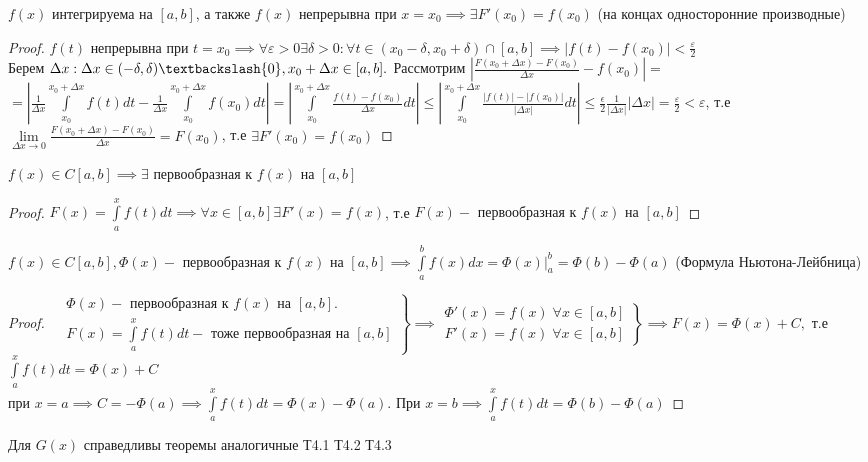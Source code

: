 \documentclass[../main.tex]{subfiles}
\begin{document}
\begin{theorem}
    $f(x)$ интегрируема на $[a,b]$, а также $f(x)$ непрерывна при $x=x_{0}\implies \exists F'(x_{0})=f(x_{0})$ (на концах односторонние производные)
\end{theorem}
\begin{proof}
    $f(t) $ непрерывна при $t=x_{0}\implies \forall \varepsilon >0 \exists \delta > 0 : \forall t\in (x_{0}-\delta,x_{0}+\delta)\cap [a,b]\implies |f(t)-f(x_{0})|<\frac{\varepsilon}{2}$\\ 
    Берем $\Delta x : \Delta x \in (-\delta,\delta) \textbackslash \{0\},x_{0}+\Delta x\in [a,b].$ Рассмотрим $\left| \frac{F(x_{0}+\Delta x)-F(x_{0})}{\Delta x}-f(x_{0}) \right|=$\\ \vspace{0.5cm}$ = \left| \frac{1}{\Delta x} \int\limits_{ x_{0}    }^{x_{0}+\Delta x} f(t)dt- \frac{1}{\Delta x}\int\limits_{x_{0}}^{x_{0}+\Delta x}f(x_{0})dt\right| =\left| \int\limits_{x_{0}}^{x_{0}+\Delta x} \frac{f(t)-f(x_{0})}{\Delta x} dt\right| \leqslant \left| \int\limits_{x_{0}}^{x_{0}+\Delta x} \frac{|f(t)|-|f(x_{0})|}{|\Delta x|}dt\right|    \leqslant \frac{\epsilon}{2} \frac{1}{|\Delta x|} |\Delta x| =\frac{\varepsilon}{2 } <\varepsilon$, т.е
    $\lim\limits_{\Delta x\to 0}\frac{F(x_{0}+\Delta x)-F(x_{0})}{\Delta x}=F(x_{0})$, т.е $ \exists F'(x_{0})=f(x_{0})$
\end{proof}
\begin{theorem}
    $f(x)\in C[a,b]\implies \exists \text{ первообразная к }f(x) \text{ на } [a,b]$
\end{theorem}
\begin{proof}
    $F(x)=\int\limits_{a   }^{x    } f(t)dt\implies \forall x\in[a,b] \exists F'(x)=f(x)$, т.е $F(x) - \text{ первообразная к } f(x) \text{ на } [a,b]$
\end{proof}
\begin{theorem}
    $f(x)\in C[a,b], \varPhi(x)-\text{ первообразная к } f(x) \text{ на }[a,b]\implies \int\limits_{a  }^{b    } f(x)dx=\varPhi(x)\bigg|_{a}^{b}=\varPhi(b)-\varPhi(a)$ (Формула Ньютона-Лейбница)
\end{theorem}
\begin{proof}
    
    $\left. \begin{aligned}&\varPhi (x) - \text{ первообразная к } f(x) \text{ на }[a,b].\\ &F(x)=\int\limits_{a}^{x}f(t)dt-\text{ тоже первообразная на }[a,b]\end{aligned}\right\} \implies \left. \begin{aligned}\varPhi'(x)=f(x)\;  \forall x\in[a,b] \\ F'(x)=f(x) \; \forall x\in[a,b]\end{aligned} \right\} \implies F(x)=\varPhi (x) +C,$ т.е $\int\limits_{a   }^{x    } f(t)dt= \varPhi(x)+C$\\ 
    при $x=a\implies C=-\varPhi(a)\implies \int\limits_{a}^{x} f(t)dt=\varPhi(x)-\varPhi(a). \text{ При } x=b \implies \int\limits_{a}^{x} f(t)dt=\varPhi(b)-\varPhi(a)$
\end{proof}
Для $G(x)$ справедливы теоремы аналогичные Т4.1 Т4.2 Т4.3
\end{document}
